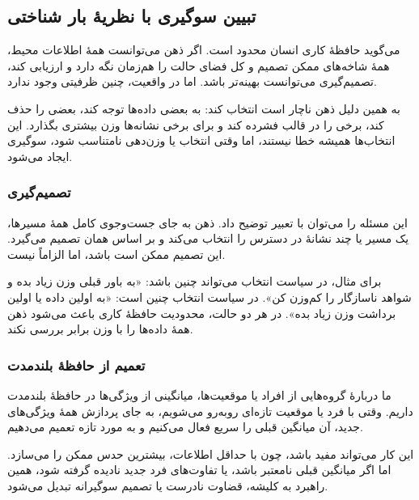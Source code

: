\subsection{تبیین سوگیری با نظریهٔ بار شناختی}
 می‌گوید حافظهٔ کاری انسان محدود است. اگر ذهن می‌توانست همهٔ اطلاعات محیط، همهٔ شاخه‌های ممکن تصمیم و کل فضای حالت را هم‌زمان نگه دارد و ارزیابی کند، تصمیم‌گیری می‌توانست بهینه‌تر باشد. اما در واقعیت، چنین ظرفیتی وجود ندارد.

به همین دلیل ذهن ناچار است انتخاب کند: به بعضی داده‌ها توجه کند، بعضی را حذف کند، برخی را در قالب  فشرده کند و برای برخی نشانه‌ها وزن بیشتری بگذارد. این انتخاب‌ها همیشه خطا نیستند، اما وقتی انتخاب یا وزن‌دهی نامتناسب شود، سوگیری ایجاد می‌شود.

\subsubsection{تصمیم‌گیری }
این مسئله را می‌توان با تعبیر  توضیح داد. ذهن به جای جست‌وجوی کامل همهٔ مسیرها، یک مسیر یا چند نشانهٔ در دسترس را انتخاب می‌کند و بر اساس همان تصمیم می‌گیرد. این تصمیم ممکن است  باشد، اما الزاماً  نیست.

برای مثال، در  سیاست انتخاب می‌تواند چنین باشد: «به باور قبلی وزن زیاد بده و شواهد ناسازگار را کم‌وزن کن». در  سیاست انتخاب چنین است: «به اولین داده یا اولین برداشت وزن زیاد بده». در هر دو حالت، محدودیت حافظهٔ کاری باعث می‌شود ذهن همهٔ داده‌ها را با وزن برابر بررسی نکند.

\subsubsection{تعمیم از حافظهٔ بلندمدت}
ما دربارهٔ گروه‌هایی از افراد یا موقعیت‌ها، میانگینی از ویژگی‌ها در حافظهٔ بلندمدت داریم. وقتی با فرد یا موقعیت تازه‌ای روبه‌رو می‌شویم، به جای پردازش همهٔ ویژگی‌های جدید، آن میانگین قبلی را سریع فعال می‌کنیم و به مورد تازه تعمیم می‌دهیم.

این کار می‌تواند مفید باشد، چون با حداقل اطلاعات، بیشترین حدس ممکن را می‌سازد. اما اگر میانگین قبلی نامعتبر باشد، یا تفاوت‌های فرد جدید نادیده گرفته شود، همین راهبرد به کلیشه، قضاوت نادرست یا تصمیم سوگیرانه تبدیل می‌شود.

